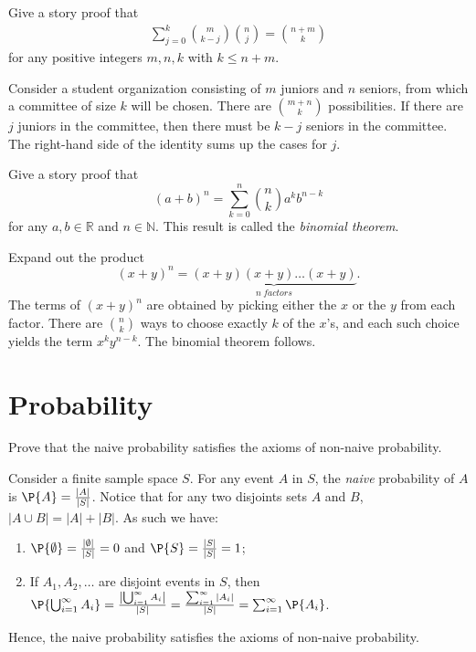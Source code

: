 	\begin{exercise}\label{ex:chap01:12}
		Give a story proof that
		\begin{align*}
			\sum_{j = 0}^k \binom{m}{k - j} \binom{n}{j} = \binom{n + m}{k}
		\end{align*}
		for any positive integers $m, n, k$ with $k \leq n + m$.
		\begin{solution}
			Consider a student organization consisting of $m$ juniors and $n$ seniors, from which a committee of size $k$ will be chosen. There are $\binom{m+n}{k}$ possibilities. If there are $j$ juniors in the committee, then there must be $k - j$ seniors in the committee. The right-hand side of the identity sums up the cases for $j$.
		\end{solution}
	\end{exercise}

	\begin{exercise}
		Give a story proof that
		\begin{equation}
			(a + b)^n = \sum_{k=0}^n {n \choose k}a^k b^{n-k}
		\end{equation}
		for any $a,b \in \mathbb{R}$ and $n \in \mathbb{N}$. This result is called the \emph{binomial theorem}.
		\begin{solution}
			Expand out the product
			\begin{equation*}
				(x + y)^n = \underbrace{(x + y)(x + y) \ldots (x + y)}_{n \: factors}.
			\end{equation*}
			The terms of $(x + y)^n$ are obtained by picking either the $x$ or the $y$ from each factor. There are $\binom{n}{k}$ ways to choose exactly $k$ of the $x$'s, and each such choice yields the term $x^k y^{n - k}$. The binomial theorem follows.
		\end{solution}
	\end{exercise}

\section{Probability}
\label{sec:section-1.4}	 
	
	\begin{exercise}
		Prove that the naive probability satisfies the axioms of non-naive probability. 
		\begin{solution}
			Consider a finite sample space $S$. For any event $A$ in $S$, the \emph{naive} probability of $A$ is $\P{A} = \frac{|A|}{|S|}$. Notice that for any two disjoints sets $A$ and $B$, $|A \cup B| = |A| + |B|$. As such we have:
			\begin{enumerate}
				\item $\P{\emptyset} = \frac{|\emptyset|}{|S|} = 0$ and $\P{S} = \frac{|S|}{|S|} = 1$;
				\item If $A_1, A_2, \hdots$ are disjoint events in $S$, then $\P{\bigcup_{i = 1}^{\infty} A_i} = \frac{\left|\bigcup_{i = 1}^{\infty} A_i\right|}{|S|} = \frac{\sum_{i = 1}^{\infty} |A_i|}{|S|} = \sum_{i = 1}^{\infty} \P{A_i}$.
			\end{enumerate}
			Hence, the naive probability satisfies the axioms of non-naive probability. 
		\end{solution}
	\end{exercise}
	
